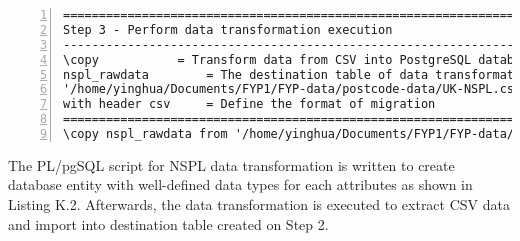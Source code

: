 \begin{lstlisting}[breaklines, frame=single, numbers=left, caption={PL/pgSQL's scripts for NSPL data transformation.}, label=commandline-02]
==================================================================================
Step 3 - Perform data transformation execution
----------------------------------------------------------------------------------
\copy 			= Transform data from CSV into PostgreSQL database 
nspl_rawdata 		= The destination table of data transformation 
'/home/yinghua/Documents/FYP1/FYP-data/postcode-data/UK-NSPL.csv' = The directory of raw data 
with header csv 	= Define the format of migration 
==================================================================================
\copy nspl_rawdata from '/home/yinghua/Documents/FYP1/FYP-data/postcode-data/UK-NSPL.csv' with header csv;
\end{lstlisting}

The PL/pgSQL script for NSPL data transformation is written to create database entity with well-defined data types for each attributes as shown in Listing K.2. Afterwards, the data transformation is executed to extract CSV data and import into destination table created on Step 2. 

\newpage

